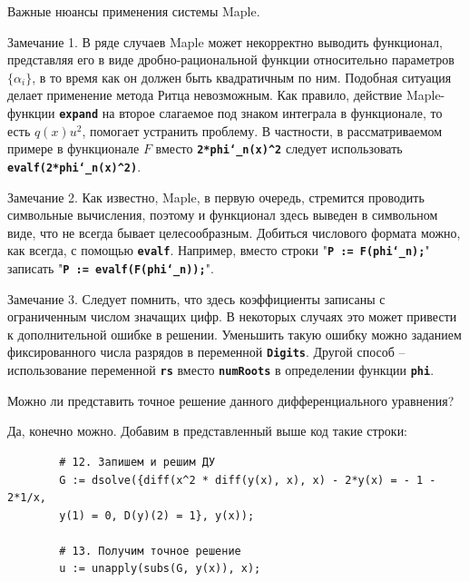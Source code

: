 \documentclass{article}
\begin{document}
\begin{warn}[ВНИМАНИЕ!]
	Важные нюансы применения системы Maple.
	
	Замечание 1. В ряде случаев Maple может некорректно выводить функционал, представляя его в виде дробно-рациональной функции относительно параметров $\{\alpha_{i}\}$, в то время как он должен быть квадратичным по ним. Подобная ситуация делает применение метода Ритца невозможным. Как правило, действие Maple-функции \textbf{\texttt{expand}} на второе слагаемое под знаком интеграла в функционале, то есть $q(x)u^{2}$, помогает устранить проблему. В частности, в рассматриваемом примере в функционале $F$ вместо \textbf{\texttt{2*phi\char`_n(x)\^{}2}} следует использовать \textbf{\texttt{evalf(2*phi\char`_n(x)\^{}2)}}.
	
	Замечание 2. Как известно, Maple, в первую очередь, стремится проводить символьные вычисления, поэтому и функционал здесь выведен в символьном виде, что не всегда бывает целесообразным. Добиться числового формата можно, как всегда, с помощью \textbf{\texttt{evalf}}. Например, вместо строки "\textbf{\texttt{P := F(phi\char`_n);}}" \; записать \; "\textbf{\texttt{P := evalf(F(phi\char`_n));}}".
	
	Замечание 3. Следует помнить, что здесь коэффициенты записаны с ограниченным числом значащих цифр. В некоторых случаях это может привести к дополнительной ошибке в решении. Уменьшить такую ошибку можно заданием фиксированного числа разрядов в переменной \textbf{\texttt{Digits}}. Другой способ -- использование переменной \textbf{\texttt{rs}} вместо \textbf{\texttt{numRoots}} в определении функции \textbf{\texttt{phi}}.
\end{warn}

\begin{question}
	Можно ли представить точное решение данного дифференциального уравнения?
\end{question}

Да, конечно можно. Добавим в представленный выше код такие строки:

\begin{commandline}
	\begin{verbatim}
		# 12. Запишем и решим ДУ
		G := dsolve({diff(x^2 * diff(y(x), x), x) - 2*y(x) = - 1 - 2*1/x,
		y(1) = 0, D(y)(2) = 1}, y(x));
		
		# 13. Получим точное решение
		u := unapply(subs(G, y(x)), x);
	\end{verbatim}
\end{commandline}
\end{document}
